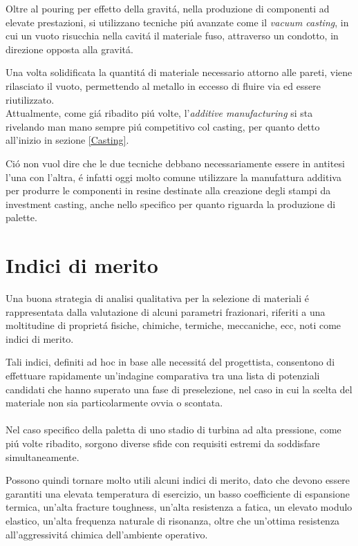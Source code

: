\documentclass{article}
\begin{document}
        Oltre al pouring per effetto della gravitá, nella 
        produzione di componenti ad 
        elevate prestazioni, si utilizzano tecniche piú avanzate come il 
        \textit{vacuum casting}, in cui un vuoto risucchia nella cavitá
        il materiale fuso, attraverso un condotto, in direzione opposta alla gravitá. 

        Una volta solidificata la quantitá di materiale necessario attorno alle pareti,
        viene rilasciato il vuoto, permettendo al metallo in eccesso di fluire via ed essere riutilizzato. \\ 


        Attualmente, come giá ribadito piú volte, l'\textit{additive manufacturing} si sta rivelando
        man mano sempre piú competitivo col casting, per quanto detto all'inizio in sezione \ref{Casting}. 

        Ció non vuol dire che le due tecniche debbano necessariamente essere in antitesi l'una con l'altra, é 
        infatti oggi molto comune utilizzare la manufattura additiva per produrre le componenti in resine 
        destinate alla creazione degli stampi da investment casting, anche nello specifico per quanto riguarda la produzione
        di palette. 


        \clearpage


    \section{Indici di merito\label{material_index}}


        Una buona strategia di analisi qualitativa per la selezione di materiali é rappresentata dalla valutazione di alcuni parametri frazionari, riferiti a una moltitudine di proprietá fisiche, chimiche, termiche, meccaniche, ecc, noti come indici di merito.
        
        Tali indici, definiti ad hoc in base alle necessitá del progettista, consentono di effettuare rapidamente un’indagine comparativa tra una lista di potenziali candidati che hanno superato una fase di preselezione, nel caso in cui la scelta del materiale non sia particolarmente ovvia o scontata. 
        \\ \\
        Nel caso specifico della paletta di uno stadio di turbina ad alta pressione, come piú volte ribadito, sorgono diverse sfide con requisiti estremi da soddisfare simultaneamente.

        Possono quindi tornare molto utili alcuni indici di merito, dato che devono essere garantiti una elevata temperatura di esercizio, un basso coefficiente di espansione termica, un’alta fracture toughness, un’alta resistenza a fatica, un elevato modulo elastico, un’alta frequenza naturale di risonanza, oltre che un’ottima resistenza all’aggressivitá chimica dell’ambiente operativo. 
        
\end{document}
